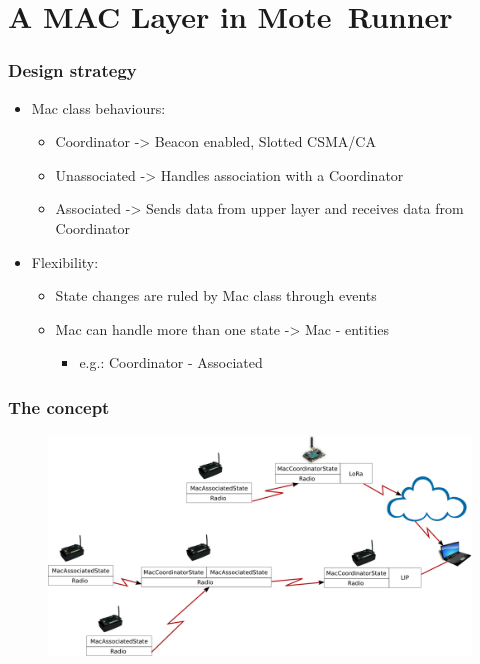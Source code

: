 \section{A MAC Layer in \mbox{Mote Runner}}
\begin{frame}[fragile]
  \frametitle{Design strategy}
  \begin{itemize}
    \item Mac class behaviours:
    \begin{itemize}
      \item Coordinator -> Beacon enabled, Slotted CSMA/CA
      \item Unassociated -> Handles association with a Coordinator
      \item Associated -> Sends data from upper layer and receives data from Coordinator
    \end{itemize}
    \item Flexibility:
    \begin{itemize}
    	\item State changes are ruled by Mac class through events
    	\item Mac can handle more than one state -> Mac - entities
    	\begin{itemize}
	  \item e.g.: Coordinator - Associated
    	\end{itemize}
    \end{itemize}
  \end{itemize}
\end{frame}

\begin{frame}[fragile]
  \frametitle{The concept}
  \begin{figure}
    \centering
    \includegraphics[width=\textwidth]{img/MAClan.png}
  \end{figure}
\end{frame}

